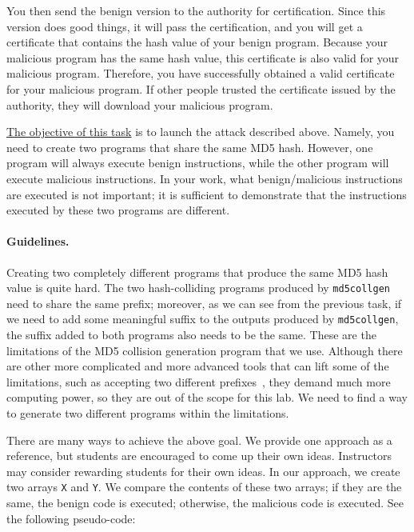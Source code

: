 You then send the benign version to the authority for certification. Since this version
does good things, it will pass the certification, and you will get a certificate
that contains the hash value of your benign program. Because your malicious program has the
same hash value, this certificate is also valid for your malicious program. Therefore, you have
successfully obtained a valid certificate for your malicious program. If other people trusted
the certificate issued by the authority, they will download your malicious program. 


\underline{The objective of this task} is to launch the attack described above. 
Namely, you need to create two programs that 
share the same MD5 hash. However, one program
will always execute benign instructions, while the other program will 
execute malicious instructions. In your work, what benign/malicious instructions are 
executed is not important; it is sufficient to demonstrate that the
instructions executed by these two programs are different. 



\paragraph{Guidelines.}
Creating two completely different programs that produce the same MD5 hash value is quite hard.
The two hash-colliding programs produced by \texttt{md5collgen} need to share the same prefix;
moreover, as we can see from the previous task, if we need to add some meaningful suffix 
to the outputs produced by \texttt{md5collgen}, the suffix added to both 
programs also needs to be the same. These are the limitations of the 
MD5 collision generation program that we use. 
Although there are other more complicated and more advanced tools that can lift some of the
limitations, such as accepting two different prefixes~\cite{stevens2007}, they demand much more 
computing power, so they are out of the scope for this lab. We need to find a way to 
generate two different programs within the limitations.


There are many ways to achieve the above goal. We provide one approach as a reference,
but students are encouraged to come up their own ideas. Instructors may consider rewarding
students for their own ideas. 
In our approach, we create two arrays \texttt{X} and \texttt{Y}. We
compare the contents of these two arrays; if they are the same, the benign code is executed;
otherwise, the malicious code is executed. See the following pseudo-code: 



